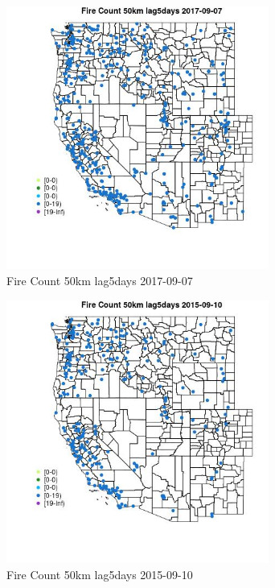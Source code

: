 \begin{figure} 
\centering  
\includegraphics[width=0.77\textwidth]{Code_Outputs/Report_ML_input_PM25_Step4_part_e_de_duplicated_aves_compiled_2019-05-20wNAs_MapObsFire_Count_50km_lag5days2017-09-07.jpg} 
\caption{\label{fig:Report_ML_input_PM25_Step4_part_e_de_duplicated_aves_compiled_2019-05-20wNAsMapObsFire_Count_50km_lag5days2017-09-07}Fire Count 50km lag5days 2017-09-07} 
\end{figure} 
 

\begin{figure} 
\centering  
\includegraphics[width=0.77\textwidth]{Code_Outputs/Report_ML_input_PM25_Step4_part_e_de_duplicated_aves_compiled_2019-05-20wNAs_MapObsFire_Count_50km_lag5days2015-09-10.jpg} 
\caption{\label{fig:Report_ML_input_PM25_Step4_part_e_de_duplicated_aves_compiled_2019-05-20wNAsMapObsFire_Count_50km_lag5days2015-09-10}Fire Count 50km lag5days 2015-09-10} 
\end{figure} 
 

